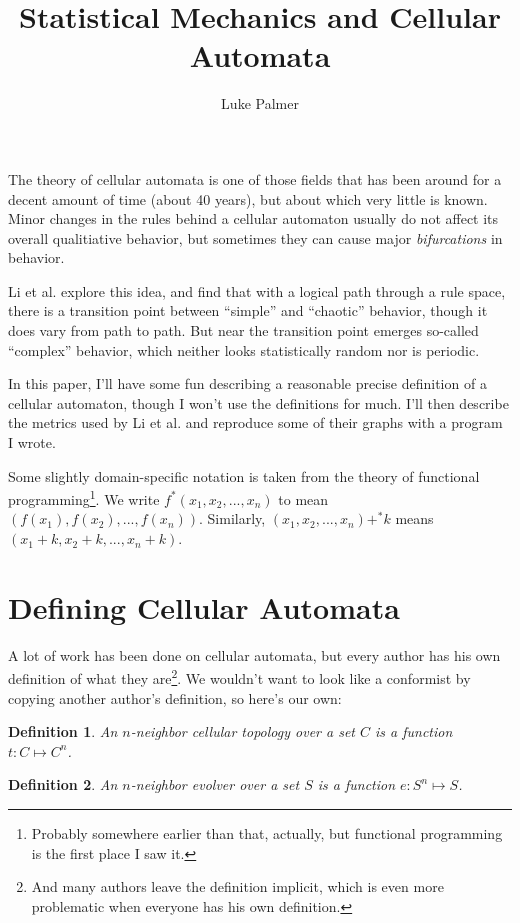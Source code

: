 \documentclass[12pt]{article}
\title{Statistical Mechanics and Cellular Automata}
\author{Luke Palmer}
\newtheorem*{Definition}{Definition}
\begin{document}
\maketitle

The theory of cellular automata is one of those fields that has been
around for a decent amount of time (about 40 years), but about which
very little is known.  Minor changes in the rules behind a cellular
automaton usually do not affect its overall qualitiative behavior, but
sometimes they can cause major \textit{bifurcations} in behavior.

Li et al. \cite{Li-1990} explore this idea, and find that with a logical
path through a rule space, there is a transition point between
``simple'' and ``chaotic'' behavior, though it does vary from path to
path.  But near the transition point emerges so-called ``complex''
behavior, which neither looks statistically random nor is periodic.

In this paper, I'll have some fun describing a reasonable precise
definition of a cellular automaton, though I won't use the definitions
for much.  I'll then describe the metrics used by Li et al. and
reproduce some of their graphs with a program I wrote.  

Some slightly domain-specific notation is taken from the theory of
functional programming\footnote{Probably somewhere earlier than that,
actually, but functional programming is the first place I saw it.}.  We
write $f^*(x_1, x_2, ..., x_n)$ to mean $(f(x_1), f(x_2), ..., f(x_n))$.
Similarly, $(x_1, x_2, ..., x_n) +^* k$ means $(x_1 + k, x_2 + k, ...,
x_n + k)$.

\section{Defining Cellular Automata}

A lot of work has been done on cellular automata, but every author has
his own definition of what they are\footnote{And many authors leave the
definition implicit, which is even more problematic when everyone has
his own definition.}.  We wouldn't want to look like a conformist by
copying another author's definition, so here's our own:

\begin{Definition}
An $n$-neighbor cellular topology over a set $C$ is a function $t: C
\mapsto C^n$.  
\end{Definition}

\begin{Definition}
An $n$-neighbor evolver over a set $S$ is a function $e: S^n \mapsto S$.
\end{Definition}
\end{document}
